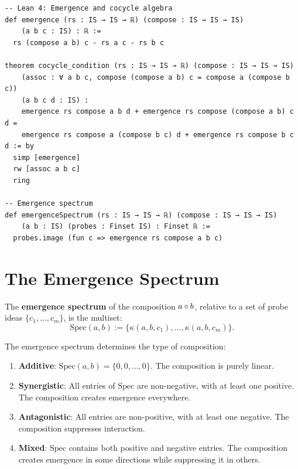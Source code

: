 \begin{lstlisting}
-- Lean 4: Emergence and cocycle algebra
def emergence (rs : IS → IS → ℝ) (compose : IS → IS → IS)
    (a b c : IS) : ℝ :=
  rs (compose a b) c - rs a c - rs b c

theorem cocycle_condition (rs : IS → IS → ℝ) (compose : IS → IS → IS)
    (assoc : ∀ a b c, compose (compose a b) c = compose a (compose b c))
    (a b c d : IS) :
    emergence rs compose a b d + emergence rs compose (compose a b) c d =
    emergence rs compose a (compose b c) d + emergence rs compose b c d := by
  simp [emergence]
  rw [assoc a b c]
  ring

-- Emergence spectrum
def emergenceSpectrum (rs : IS → IS → ℝ) (compose : IS → IS → IS)
    (a b : IS) (probes : Finset IS) : Finset ℝ :=
  probes.image (fun c => emergence rs compose a b c)
\end{lstlisting}

\section{The Emergence Spectrum}

\begin{definition}
\label{def:emergence-spectrum}
The \textbf{emergence spectrum} of the composition $a \circ b$, relative
to a set of probe ideas $\{c_1, \ldots, c_m\}$, is the multiset:
\[
  \mathrm{Spec}(a, b) := \{\kappa(a, b, c_1), \ldots, \kappa(a, b, c_m)\}.
\]
\end{definition}

\begin{theorem}
\label{thm:spectral-type}
The emergence spectrum determines the type of composition:
\begin{enumerate}
\item \textbf{Additive}: $\mathrm{Spec}(a, b) = \{0, 0, \ldots, 0\}$.
  The composition is purely linear.
\item \textbf{Synergistic}: All entries of $\mathrm{Spec}$ are non-negative,
  with at least one positive. The composition creates emergence everywhere.
\item \textbf{Antagonistic}: All entries are non-positive, with at least one
  negative. The composition suppresses interaction.
\item \textbf{Mixed}: $\mathrm{Spec}$ contains both positive and negative
  entries. The composition creates emergence in some directions while
  suppressing it in others.
\end{enumerate}
\end{theorem}

